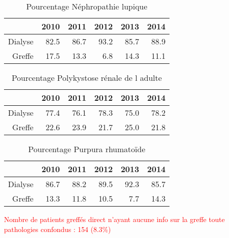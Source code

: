 \documentclass[11pt,a4paper]{article}\usepackage[]{graphicx}\usepackage[]{color}
\begin{document}
\begin{multicols}{2}
\begin{table}[H]
\end{table}
\begin{table}[H]
\centering
\begin{tabular}{rrrrrr}
  \hline
 & 2010 & 2011 & 2012 & 2013 & 2014 \\ 
  \hline
Dialyse & 82.5 & 86.7 & 93.2 & 85.7 & 88.9 \\ 
  Greffe & 17.5 & 13.3 & 6.8 & 14.3 & 11.1 \\ 
   \hline
\end{tabular}
\caption{Pourcentage Néphropathie lupique} 
\end{table}
\begin{table}[H]
\centering
\begin{tabular}{rrrrrr}
  \hline
 & 2010 & 2011 & 2012 & 2013 & 2014 \\ 
  \hline
Dialyse & 77.4 & 76.1 & 78.3 & 75.0 & 78.2 \\ 
  Greffe & 22.6 & 23.9 & 21.7 & 25.0 & 21.8 \\ 
   \hline
\end{tabular}
\caption{Pourcentage Polykystose rénale de l adulte} 
\end{table}
\begin{table}[H]
\centering
\begin{tabular}{rrrrrr}
  \hline
 & 2010 & 2011 & 2012 & 2013 & 2014 \\ 
  \hline
Dialyse & 86.7 & 88.2 & 89.5 & 92.3 & 85.7 \\ 
  Greffe & 13.3 & 11.8 & 10.5 & 7.7 & 14.3 \\ 
   \hline
\end{tabular}
\caption{Pourcentage Purpura rhumatoïde} 
\end{table}

\end{multicols}

\textcolor{red}{Nombre de patients greffés direct n'ayant aucune info sur la greffe toute pathologies confondus : 154 (8.3\%)}
~\\


\end{document}
